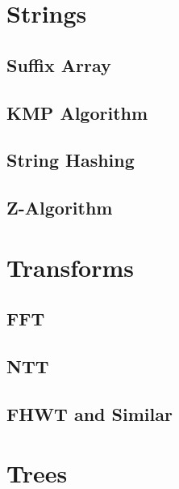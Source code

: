 \section{Strings}
\subsection{Suffix Array}
\raggedbottom
\hrulefill
\subsection{KMP Algorithm}
\raggedbottom
\hrulefill
\subsection{String Hashing}
\raggedbottom
\hrulefill
\subsection{Z-Algorithm}
\raggedbottom
\hrulefill

\section{Transforms}
\subsection{FFT}
\raggedbottom
\hrulefill
\subsection{NTT}
\raggedbottom
\hrulefill
\subsection{FHWT and Similar}
\raggedbottom
\hrulefill

\section{Trees}
